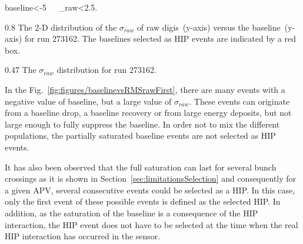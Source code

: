 {
baseline<-5~~~\sigma_{raw}<2.5.
}


                 {0.8}       %
                 {The 2-D distribution of the $\sigma_{raw}$ of raw digis~(y-axis) versus the baseline~(y-axis) for run 273162. The baselines selected as HIP events are indicated by a red box. } %




                 {0.47}       %
                 {The $\sigma_{raw}$ distribution for run 273162. }

In the Fig.~\ref{fig:figures/baselinevsRMSrawFirst}, there are many events with a negative value of baseline, but a large value of $\sigma_{raw}$. These events can originate from a baseline drop, a baseline recovery or from large energy deposits, but not large enough to fully suppress the baseline. In order not to mix the different populations, the partially saturated baseline events are not selected as HIP events. 

It has also been observed that the full saturation can last for several bunch crossings as it is shown in Section~\ref{sec:limitationsSelection} and consequently for a given APV, several consecutive events could be selected as a HIP. In this case, only the first event of these possible events is defined as the selected HIP. In addition, as the saturation of the baseline is a consequence of the HIP interaction, the HIP event does not have to be selected at the time when the real HIP interaction has occurred in the sensor. 


